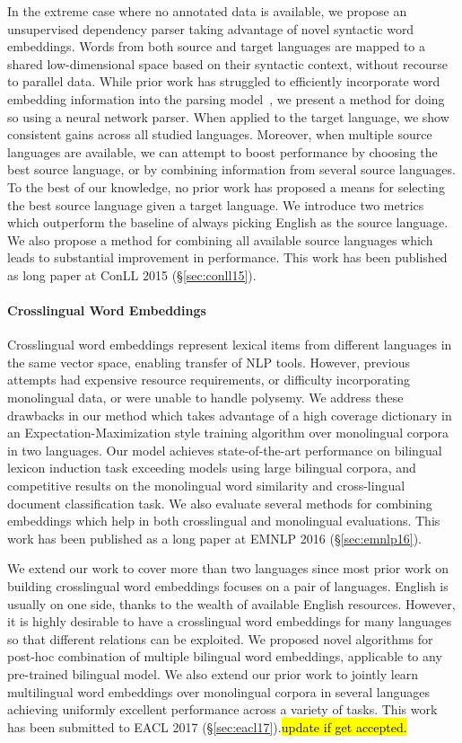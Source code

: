 \documentclass[12pt,twoside,final,hidelinks]{ltthesis}
\theoremstyle{definition}
\newcommand\conllv{ConLL 2015 (\S\ref{sec:conll15})}
\newcommand\emnlpvi{EMNLP 2016 (\S\ref{sec:emnlp16})}
\newcommand\eaclvii{EACL 2017 (\S\ref{sec:eacl17})}
\newcommand{\tofix}[1]{\hl{#1}}
\begin{document}
In the extreme case where no annotated data is available, we propose an unsupervised dependency parser taking advantage of novel 
syntactic word embeddings. Words from both source and target languages are mapped to a shared low-dimensional
space based on their syntactic context, without recourse to parallel data.
While prior work has struggled to efficiently incorporate word embedding information into the parsing model~\cite{mohit:ACL14,andreas-klein:2014:P14-2,chen-zhang-zhang:2014:Coling},
we present a method for doing so using a neural network parser. When applied to the target language, we show consistent gains across all studied languages.
Moreover, when multiple source languages are available, we can attempt to boost
performance by choosing the best source language, or by combining
information from several source languages. To the best
of our knowledge, no prior work has proposed a means for selecting the
best source language given a target language. We
introduce two metrics which outperform the baseline of always picking
English as the source language. We also propose a method for combining
all available source languages which leads to substantial improvement in performance.
This work has been published as long paper at \conllv. 

\paragraph{Crosslingual Word Embeddings}
Crosslingual word embeddings represent lexical items from different languages in the same vector space, enabling transfer of NLP tools. 
However, previous attempts had %
expensive resource requirements, or difficulty incorporating monolingual data, or were unable to handle polysemy.
We address these drawbacks in our method which takes advantage of a high coverage dictionary in an Expectation-Maximization style training algorithm over monolingual corpora in two languages. Our model achieves state-of-the-art performance on bilingual lexicon induction task exceeding models using large bilingual corpora, and
competitive results on the monolingual word similarity and cross-lingual document classification task. We also evaluate several methods for combining embeddings which help in both crosslingual and monolingual evaluations. This work has been published as a long paper at \emnlpvi. 

We extend our work to cover more than two languages since most prior work on building crosslingual word embeddings focuses on a pair of languages.
English is usually on one side, thanks to the wealth of available English resources.
However, it is highly desirable to have a crosslingual word embeddings for many languages so that different relations can be exploited. We proposed novel algorithms for post-hoc combination of multiple bilingual word embeddings, applicable to any pre-trained bilingual model. We also extend our prior work to jointly learn multilingual word embeddings over monolingual corpora in several languages achieving uniformly excellent performance across a variety of tasks. This work has been submitted to \eaclvii.\tofix{update if get accepted.}
\end{document}
